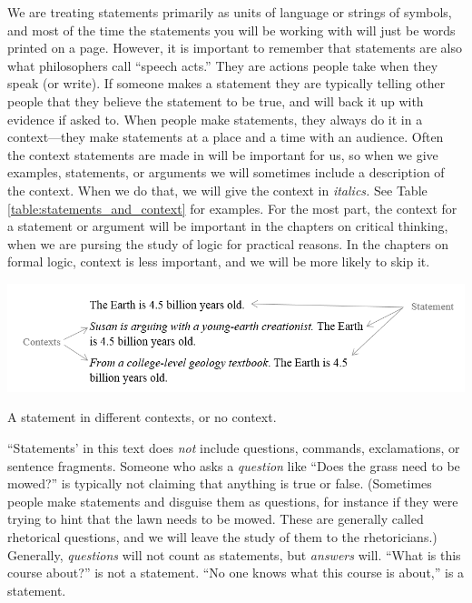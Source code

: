 We are treating statements primarily as units of language or strings of symbols, and most of the time the statements you will be working with will just be words printed on a page. However, it is important to remember that statements are also what philosophers call ``speech acts.'' They are actions people take when they speak (or write). If someone makes a statement they are typically telling other people that they believe the statement to be true, and will back it up with evidence if asked to. When people make statements, they always do it in a context---they make statements at a place and a time with an audience. Often the context statements are made in will be important for us, so when we give examples, statements, or arguments we will sometimes include a description of the context. When we do that, we will give the context in \textit{italics.} See Table \ref{table:statements_and_context} for examples. \label{context_marker} For the most part, the context for a statement or argument will be important in the chapters on critical thinking, when we are pursing the study of logic for practical reasons. In the chapters on formal logic, context is less important, and we will be more likely to skip it. 

\begin{table}
\begin{mdframed}[style=mytableclearbox]
\includegraphics*[width=\linewidth]{img/statement_and_contexts}
\end{mdframed}
\caption{A statement in different contexts, or no context.} \label{table:statements_and_context}
\end{table}


``Statements' in this text does \emph{not} include questions, commands, exclamations, or sentence fragments. Someone who asks a \emph{question} like ``Does the grass need to be mowed?'' is typically not claiming that anything is true or false. (Sometimes people make statements and disguise them as questions, for instance if they were trying to hint that the lawn needs to be mowed. These are generally called rhetorical questions, and we will leave the study of them to the rhetoricians.) Generally, \emph{questions} will not count as statements, but \emph{answers} will. ``What is this course about?'' is not a statement. ``No one knows what this course is about,'' is a statement.

